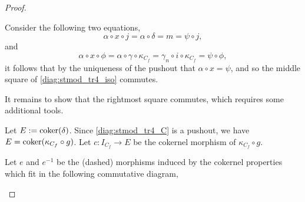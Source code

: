 \begin{proof}
\begin{enumerate}[label={(\bfseries TR\arabic*)}]
{\begin{center}
            \end{center}
            Consider the following two equations,
            \[
                \alpha \circ x \circ j = \alpha \circ \delta = m = \psi \circ j,
            \]
            and
            \[
                \alpha \circ x \circ \phi = \alpha \circ \gamma \circ \kappa_{C_f} = \gamma_n \circ i \circ \kappa_{C_f} = \psi \circ \phi,
            \]
            it follows that by the uniqueness of the pushout that \( \alpha \circ x = \psi \), and so the middle square of \autoref{diag:stmod_tr4_iso} commutes.
            
            It remains to show that the rightmost square commutes, which requires some additional tools.

            Let \( E := \operatorname{coker}(\delta)\). Since \autoref{diag:stmod_tr4_C} is a pushout, we have \( E = \operatorname{coker}(\kappa_{C_f} \circ g) \). Let \( c: I_{C_f} \to E \) be the cokernel morphism of \( \kappa_{C_f} \circ g \).

            Let \( e \) and \( e^{-1} \) be the (dashed) morphisms induced by the cokernel properties which fit in the following commutative diagram,
            \begin{center}
\end{center}}
\end{enumerate}
\end{proof}
